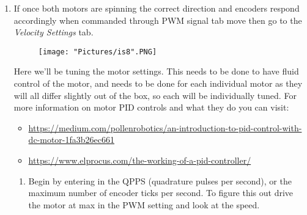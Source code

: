 \documentclass[12pt]{article}
\begin{document}
\begin{enumerate}
\begin{enumerate}
		\item Under the control pane slowly move the slider bar up for M1. 		
		\begin{figure}[H]
	 		\centering
			\texttt{[image: "Pictures/is5".PNG]}
	 		\caption{}
		\end{figure}
		\noindent Verify that when the forward signal is sent to the motor that the wheel spins in the direction that would move the rover as a whole forward (note this is different clockwise vs counterclockwise based on which wheel you are testing). If the wheel moves backwards with respect to the rover direction than switch the motor leads coming from the motor controller, which are M1A and M1B. 

		\item Now as you drive M1 motor forward (which now corresponds to the rover moving forward) verify that M1 Encoder value increases \footnote{If you get no reading values for the encoder re-check your wiring and connections}. If it is decreasing then you have to switch the A and B channels of the encoder signals. These are the EN1 +/- pins on the header pins. 

		\item Repeat 7b and 7c for M2 motor. 
	\end{enumerate}
	\item If once both motors are spinning the correct direction and encoders respond accordingly when commanded through PWM signal tab move then go to the \textit{Velocity Settings} tab.	
	
	\begin{figure}[H]
 		\centering
		\texttt{[image: "Pictures/is8".PNG]}
 		\caption{}
	\end{figure}
	\noindent Here we'll be tuning the motor settings. This needs to be done to have fluid control of the motor, and needs to be done for each individual motor as they will all differ slightly out of the box, so each will be individually tuned. For more information on motor PID controls and what they do you can visit:
	\begin{itemize}
		\item \href{https://medium.com/pollenrobotics/an-introduction-to-pid-control-with-dc-motor-1fa3b26ec661}{https://medium.com/pollenrobotics/an-introduction-to-pid-control-with-dc-motor-1fa3b26ec661}
		\item \href{https://www.elprocus.com/the-working-of-a-pid-controller/}{https://www.elprocus.com/the-working-of-a-pid-controller/}
	\end{itemize}
	\begin{enumerate}
		\item Begin by entering in the QPPS (quadrature pulses per second), or the maximum number of encoder ticks per second. To figure this out drive the motor at max in the PWM setting and look at the speed.


\end{enumerate}
\end{enumerate}
\end{document}
